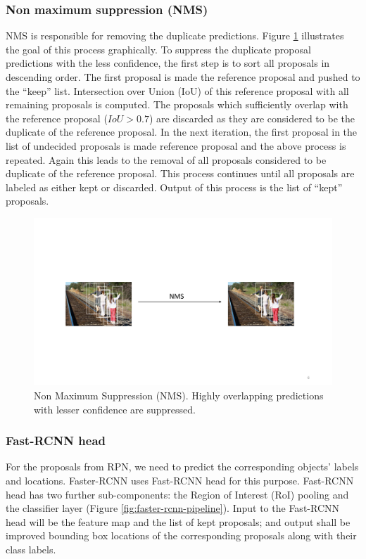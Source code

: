 \subsubsection{Non maximum suppression (NMS)}
NMS is responsible for removing the duplicate predictions. Figure \ref{fig:nms} illustrates the goal of this process graphically. To suppress the duplicate proposal predictions with the less confidence, the first step is to sort all proposals in descending order. The first proposal is made  the reference proposal and pushed to the ``keep'' list. Intersection over Union (IoU) of this reference proposal with all remaining proposals is computed. The proposals which sufficiently overlap with the reference proposal ($IoU > 0.7$) are discarded as they are considered to be the duplicate of the reference proposal. In the next iteration, the first proposal in the list of undecided proposals is made reference proposal and the above process is repeated. Again this leads to the removal of all proposals considered to be duplicate of the reference proposal. This process continues until all proposals are labeled as either kept or discarded. Output of this process is the list of ``kept'' proposals. 

\begin{figure}
    \centering
    \includegraphics[width=\linewidth,trim={0 150 0 150},clip]{images/nms}
    \caption[Non Maximum Suppression (NMS)]{Non Maximum Suppression (NMS). Highly overlapping predictions with lesser confidence are suppressed.}
    \label{fig:nms}
\end{figure}

\vspace{5pt}
\subsubsection{Fast-RCNN head}
For the proposals from RPN, we need to predict the corresponding objects' labels and locations. Faster-RCNN uses Fast-RCNN head\cite{ref_fastrcnn} for this purpose. Fast-RCNN head has two further sub-components: the Region of Interest (RoI) pooling and the classifier layer (Figure \ref{fig:faster-rcnn-pipeline}). Input to the Fast-RCNN head will be the feature map and the list of kept proposals; and output shall be improved bounding box locations of the corresponding proposals along with their class labels. 

